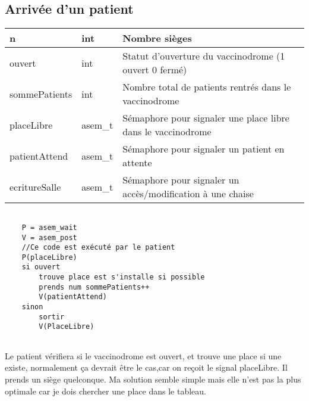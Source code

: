 \documentclass[a4paper]{article}
\makeatletter
\newenvironment{expl}{%
  \begin{list}{}{%
      \small\itshape%
      \topsep\z@%
      \listparindent0pt%
      \parsep0.75\baselineskip%
      \setlength{\leftmargin}{20mm}%
      \setlength{\rightmargin}{20mm}%
    }
  \item[]}%
  {\end{list}}
\makeatother
\begin{document}
\subsection{Arrivée d'un patient}\label{arrivee-patient}

\begin{expl}

    \begin{tabularx}{\linewidth}{|l|l|>{\strut}X|}
      \hline%
    n & int  & Nombre sièges \\ \hline%
    ouvert & int & Statut d'ouverture du vaccinodrome (1 ouvert 0 fermé)\\ \hline%
    sommePatients & int & Nombre total de patients rentrés dans le vaccinodrome \\ \hline%
    placeLibre & asem\_t & Sémaphore pour signaler une place libre dans le vaccinodrome \\ \hline%
    
    patientAttend & asem\_t & Sémaphore pour signaler un patient en attente \\ \hline%
    ecritureSalle & asem\_t & Sémaphore pour signaler un accès/modification à une chaise \\ \hline%
     \hline%
    \end{tabularx}
  \begin{verbatim}
    
    P = asem_wait
    V = asem_post 
    //Ce code est exécuté par le patient 
    P(placeLibre)
    si ouvert
        trouve place est s'installe si possible
        prends num sommePatients++ 
        V(patientAttend)
    sinon 
        sortir
        V(PlaceLibre)
    

    \end{verbatim}
    Le patient vérifiera si le vaccinodrome est ouvert, et trouve une place si une existe, normalement ça devrait être le cas,car on reçoit le signal placeLibre. Il prends un siège quelconque. Ma solution semble simple mais elle n'est pas la plus optimale car je dois chercher une place dans le tableau.
\end{expl}
\end{document}
